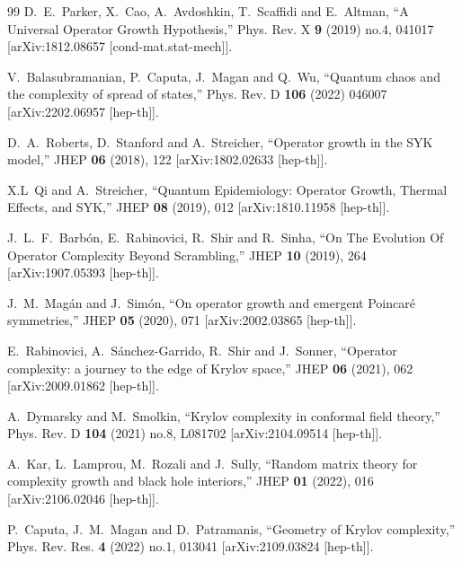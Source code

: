 \documentclass[aps,prl,twocolumn,showpacs,preprintnumbers,amsmath,amssymb]{revtex4-1}
\begin{document}
\begin{thebibliography}{99}
D.~E.~Parker, X.~Cao, A.~Avdoshkin, T.~Scaffidi and E.~Altman,
``A Universal Operator Growth Hypothesis,''
Phys. Rev. X \textbf{9} (2019) no.4, 041017
[arXiv:1812.08657 [cond-mat.stat-mech]].

V.~Balasubramanian, P.~Caputa, J.~Magan and Q.~Wu,
``Quantum chaos and the complexity of spread of states,''
Phys. Rev. D \textbf{106} (2022) 046007
[arXiv:2202.06957 [hep-th]].

D.~A.~Roberts, D.~Stanford and A.~Streicher,
``Operator growth in the SYK model,''
JHEP \textbf{06} (2018), 122
[arXiv:1802.02633 [hep-th]].

X.L~Qi and A.~Streicher,
``Quantum Epidemiology: Operator Growth, Thermal Effects, and SYK,''
JHEP \textbf{08} (2019), 012
[arXiv:1810.11958 [hep-th]].

J.~L.~F.~Barb\'on, E.~Rabinovici, R.~Shir and R.~Sinha,
``On The Evolution Of Operator Complexity Beyond Scrambling,''
JHEP \textbf{10} (2019), 264
[arXiv:1907.05393 [hep-th]].

J.~M.~Mag\'an and J.~Sim\'on,
``On operator growth and emergent Poincar\'e symmetries,''
JHEP \textbf{05} (2020), 071
[arXiv:2002.03865 [hep-th]].

E.~Rabinovici, A.~S\'anchez-Garrido, R.~Shir and J.~Sonner,
``Operator complexity: a journey to the edge of Krylov space,''
JHEP \textbf{06} (2021), 062
[arXiv:2009.01862 [hep-th]].

A.~Dymarsky and M.~Smolkin,
``Krylov complexity in conformal field theory,''
Phys. Rev. D \textbf{104} (2021) no.8, L081702
[arXiv:2104.09514 [hep-th]].

A.~Kar, L.~Lamprou, M.~Rozali and J.~Sully,
``Random matrix theory for complexity growth and black hole interiors,''
JHEP \textbf{01} (2022), 016
[arXiv:2106.02046 [hep-th]].

P.~Caputa, J.~M.~Magan and D.~Patramanis,
``Geometry of Krylov complexity,''
Phys. Rev. Res. \textbf{4} (2022) no.1, 013041
[arXiv:2109.03824 [hep-th]].


\end{thebibliography}
\end{document}
